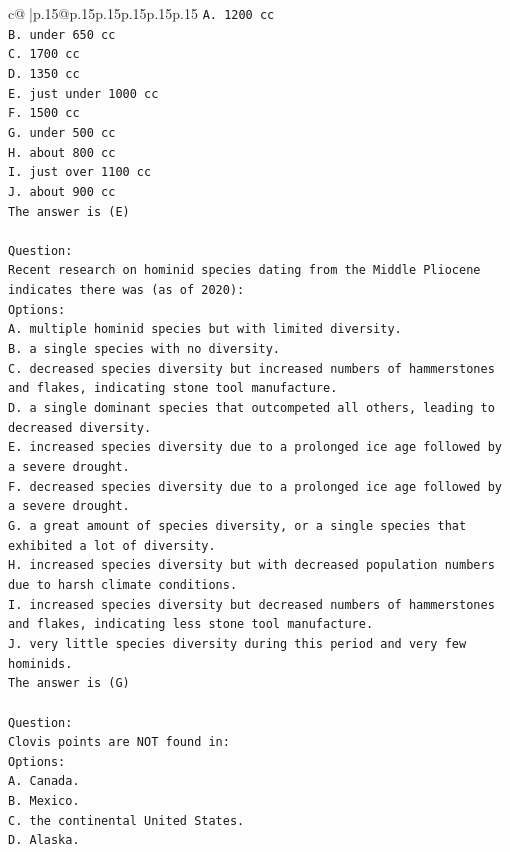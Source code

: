 \documentclass{article}
\begin{document}
{\begin{supertabular}{c@{$\;$}|p{.15\linewidth}@{}p{.15\linewidth}p{.15\linewidth}p{.15\linewidth}p{.15\linewidth}p{.15\linewidth}}
{{{\texttt{A. 1200 cc} \\
\texttt{B. under 650 cc} \\
\texttt{C. 1700 cc} \\
\texttt{D. 1350 cc} \\
\texttt{E. just under 1000 cc} \\
\texttt{F. 1500 cc} \\
\texttt{G. under 500 cc} \\
\texttt{H. about 800 cc} \\
\texttt{I. just over 1100 cc} \\
\texttt{J. about 900 cc} \\
\texttt{The answer is (E)} \\
\\ 
\texttt{Question:} \\
\texttt{Recent research on hominid species dating from the Middle Pliocene indicates there was (as of 2020):} \\
\texttt{Options:} \\
\texttt{A. multiple hominid species but with limited diversity.} \\
\texttt{B. a single species with no diversity.} \\
\texttt{C. decreased species diversity but increased numbers of hammerstones and flakes, indicating stone tool manufacture.} \\
\texttt{D. a single dominant species that outcompeted all others, leading to decreased diversity.} \\
\texttt{E. increased species diversity due to a prolonged ice age followed by a severe drought.} \\
\texttt{F. decreased species diversity due to a prolonged ice age followed by a severe drought.} \\
\texttt{G. a great amount of species diversity, or a single species that exhibited a lot of diversity.} \\
\texttt{H. increased species diversity but with decreased population numbers due to harsh climate conditions.} \\
\texttt{I. increased species diversity but decreased numbers of hammerstones and flakes, indicating less stone tool manufacture.} \\
\texttt{J. very little species diversity during this period and very few hominids.} \\
\texttt{The answer is (G)} \\
\\ 
\texttt{Question:} \\
\texttt{Clovis points are NOT found in:} \\
\texttt{Options:} \\
\texttt{A. Canada.} \\
\texttt{B. Mexico.} \\
\texttt{C. the continental United States.} \\
\texttt{D. Alaska.} \\
            }
        }
    }
     \\ \\


\end{supertabular}}
\end{document}

